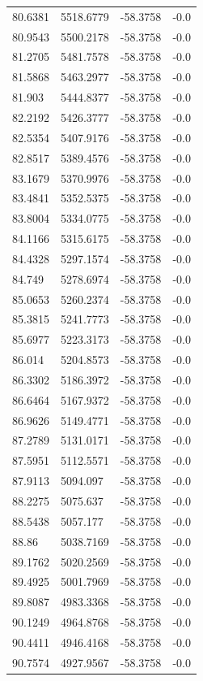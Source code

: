 \begin{table}[H]
\begin{tabular}{llll}
80.6381 & 5518.6779 & -58.3758 & -0.0 \\
80.9543 & 5500.2178 & -58.3758 & -0.0 \\
81.2705 & 5481.7578 & -58.3758 & -0.0 \\
81.5868 & 5463.2977 & -58.3758 & -0.0 \\
81.903 & 5444.8377 & -58.3758 & -0.0 \\
82.2192 & 5426.3777 & -58.3758 & -0.0 \\
82.5354 & 5407.9176 & -58.3758 & -0.0 \\
82.8517 & 5389.4576 & -58.3758 & -0.0 \\
83.1679 & 5370.9976 & -58.3758 & -0.0 \\
83.4841 & 5352.5375 & -58.3758 & -0.0 \\
83.8004 & 5334.0775 & -58.3758 & -0.0 \\
84.1166 & 5315.6175 & -58.3758 & -0.0 \\
84.4328 & 5297.1574 & -58.3758 & -0.0 \\
84.749 & 5278.6974 & -58.3758 & -0.0 \\
85.0653 & 5260.2374 & -58.3758 & -0.0 \\
85.3815 & 5241.7773 & -58.3758 & -0.0 \\
85.6977 & 5223.3173 & -58.3758 & -0.0 \\
86.014 & 5204.8573 & -58.3758 & -0.0 \\
86.3302 & 5186.3972 & -58.3758 & -0.0 \\
86.6464 & 5167.9372 & -58.3758 & -0.0 \\
86.9626 & 5149.4771 & -58.3758 & -0.0 \\
87.2789 & 5131.0171 & -58.3758 & -0.0 \\
87.5951 & 5112.5571 & -58.3758 & -0.0 \\
87.9113 & 5094.097 & -58.3758 & -0.0 \\
88.2275 & 5075.637 & -58.3758 & -0.0 \\
88.5438 & 5057.177 & -58.3758 & -0.0 \\
88.86 & 5038.7169 & -58.3758 & -0.0 \\
89.1762 & 5020.2569 & -58.3758 & -0.0 \\
89.4925 & 5001.7969 & -58.3758 & -0.0 \\
89.8087 & 4983.3368 & -58.3758 & -0.0 \\
90.1249 & 4964.8768 & -58.3758 & -0.0 \\
90.4411 & 4946.4168 & -58.3758 & -0.0 \\
90.7574 & 4927.9567 & -58.3758 & -0.0 \\

\end{tabular}
\end{table}
